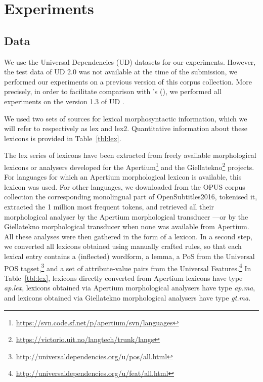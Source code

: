 \documentclass[11pt,letterpaper]{article}
\begin{document}
\section{Experiments}

\subsection{Data}

We use the Universal Dependencies (UD) datasets for our experiments. However, the test data of UD 2.0 was not available
at the time of the submission, we performed our experiments on a previous version of this corpus collection. More
precisely, in order to facilitate comparison with \citeauthor{plank16}'s (\citeyear{plank16}), we performed all
experiments on the version 1.3 of UD \cite{ud13}.

We used two sets of sources for lexical morphosyntactic information, which we will refer to respectively as {\sc lex}
and {\sc lex2}. Quantitative information about these lexicons is provided in Table~\ref{tbl:lex}.

The {\sc lex} series of lexicons have been extracted from freely available morphological lexicons or analysers developed
for the Apertium\footnote{\url{https://svn.code.sf.net/p/apertium/svn/languages}} and the
Giellatekno\footnote{\url{https://victorio.uit.no/langtech/trunk/langs}} projects. For languages for which an Apertium
morphological lexicon is available, this lexicon was used. For other languages, we downloaded from the OPUS corpus
collection the corresponding monolingual part of OpenSubtitles2016, tokenised it, extracted the 1 million most frequent
tokens, and retrieved all their morphological analyser by the Apertium morphological transducer ---or by the Giellatekno
morphological transducer when none was available from Apertium. All these analyses were then gathered in the form of a
lexicon. In a second step, we converted all lexicons obtained using manually crafted rules, so that each lexical entry
contains a (inflected) wordform, a lemma, a PoS from the Universal POS
tagset,\footnote{\url{http://universaldependencies.org/u/pos/all.html}} and a set of attribute-value pairs from the
Universal Features.\footnote{\url{http://universaldependencies.org/u/feat/all.html}} In Table~\ref{tbl:lex}, lexicons
directly converted from Apertium lexicons have type {\em ap.lex}, lexicons obtained via Apertium morphological analysers
have type {\em ap.ma}, and lexicons obtained via Giellatekno morphological analysers have type {\em gt.ma}.
\end{document}
